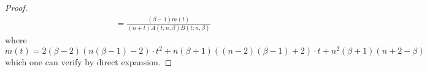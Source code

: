 \documentclass[11pt]{article}
\begin{document}
\begin{proof}
\begin{align*}
    &=\frac{(\beta-1)m(t)}{(n+t)A(t;n,\beta)B(t;n,\beta)}
\end{align*}
where 
\begin{equation}
    m(t)=2(\beta-2)(n(\beta-1)-2)\cdot t^2 +n(\beta+1)((n-2)(\beta-1)+2)\cdot t+n^2(\beta+1)(n+2-\beta)
\end{equation}
which one can verify by direct expansion.

\end{proof}
\end{document}
